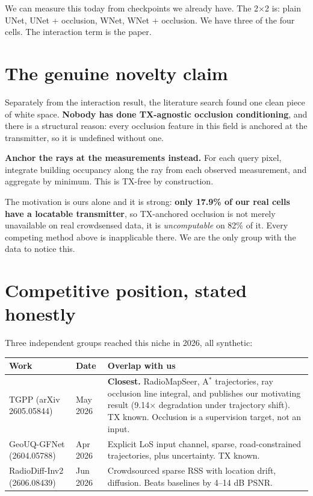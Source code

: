 \documentclass[10pt,a4paper]{article}
\newcommand{\B}[1]{\textcolor{bad}{\textbf{#1}}}
\newcommand{\G}[1]{\textcolor{good}{\textbf{#1}}}
\begin{document}
We can measure this today from checkpoints we already have. The 2$\times$2 is: plain UNet,
UNet + occlusion, WNet, WNet + occlusion. We have three of the four cells. The interaction
term is the paper.

\section{The genuine novelty claim}

Separately from the interaction result, the literature search found one clean piece of
white space. \textbf{Nobody has done TX-agnostic occlusion conditioning}, and there is a
structural reason: every occlusion feature in this field is anchored at the transmitter,
so it is undefined without one.

\textbf{Anchor the rays at the measurements instead.} For each query pixel, integrate
building occupancy along the ray from each observed measurement, and aggregate by minimum.
This is TX-free by construction.

The motivation is ours alone and it is strong: \G{only 17.9\% of our real cells have a
locatable transmitter}, so TX-anchored occlusion is not merely unavailable on real
crowdsensed data, it is \emph{uncomputable} on 82\% of it. Every competing method above
is inapplicable there. We are the only group with the data to notice this.

\section{Competitive position, stated honestly}

Three independent groups reached this niche in 2026, all synthetic:

\begin{center}\small
\begin{tabular}{@{}llp{8.4cm}@{}}
\toprule
Work & Date & Overlap with us \\ \midrule
TGPP (arXiv 2605.05844) & May 2026 & \B{Closest.} RadioMapSeer, A$^*$ trajectories, ray
occlusion line integral, and publishes our motivating result (9.14$\times$ degradation
under trajectory shift). TX known. Occlusion is a supervision target, not an input. \\
GeoUQ-GFNet (2604.05788) & Apr 2026 & Explicit LoS input channel, sparse, road-constrained
trajectories, plus uncertainty. TX known. \\
RadioDiff-Inv2 (2606.08439) & Jun 2026 & Crowdsourced sparse RSS with location drift,
diffusion. Beats baselines by 4--14 dB PSNR. \\
\bottomrule
\end{tabular}
\end{center}
\end{document}
